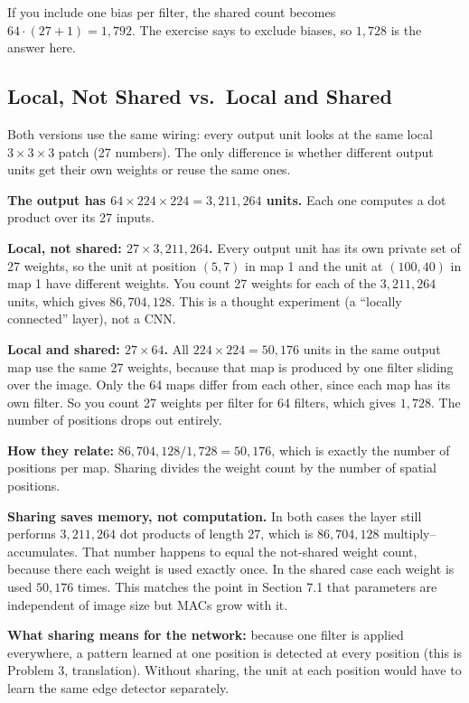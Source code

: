 If you include one bias per filter, the shared count becomes $64\cdot(27+1) = 1{,}792$. The exercise says to exclude biases, so $1{,}728$ is the answer here.

\subsection*{Local, Not Shared vs.\ Local and Shared}

Both versions use the same wiring: every output unit looks at the same local $3\times3\times3$ patch (27 numbers). The only difference is whether different output units get their own weights or reuse the same ones.

\textbf{The output has $64\times224\times224 = 3{,}211{,}264$ units.} Each one computes a dot product over its 27 inputs.

\textbf{Local, not shared: $27 \times 3{,}211{,}264$.} Every output unit has its own private set of 27 weights, so the unit at position $(5,7)$ in map 1 and the unit at $(100,40)$ in map 1 have different weights. You count 27 weights for each of the $3{,}211{,}264$ units, which gives $86{,}704{,}128$. This is a thought experiment (a ``locally connected'' layer), not a CNN.

\textbf{Local and shared: $27 \times 64$.} All $224\times224 = 50{,}176$ units in the same output map use the same 27 weights, because that map is produced by one filter sliding over the image. Only the 64 maps differ from each other, since each map has its own filter. So you count 27 weights per filter for 64 filters, which gives $1{,}728$. The number of positions drops out entirely.

\textbf{How they relate:} $86{,}704{,}128 / 1{,}728 = 50{,}176$, which is exactly the number of positions per map. Sharing divides the weight count by the number of spatial positions.

\textbf{Sharing saves memory, not computation.} In both cases the layer still performs $3{,}211{,}264$ dot products of length 27, which is $86{,}704{,}128$ multiply--accumulates. That number happens to equal the not-shared weight count, because there each weight is used exactly once. In the shared case each weight is used $50{,}176$ times. This matches the point in Section 7.1 that parameters are independent of image size but MACs grow with it.

\textbf{What sharing means for the network:} because one filter is applied everywhere, a pattern learned at one position is detected at every position (this is Problem 3, translation). Without sharing, the unit at each position would have to learn the same edge detector separately.

